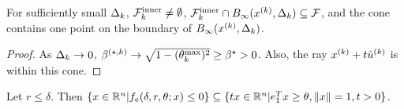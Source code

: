 \begin{theorem}
For sufficiently small $\Delta_k$, ${\mathcal {F}^{\text{inner}}_k} \ne \emptyset$, ${\mathcal {F}^{\text{inner}}_k} \cap B_{\infty}({x^{(k)}}, \Delta_k) \subseteq {\mathcal F}$, and the cone contains one point on the boundary of $B_{\infty}({x^{(k)}}, \Delta_k)$.
\end{theorem}
\begin{proof}
As $\Delta_k \to 0$, ${\beta^{(\star, k)}} \to \sqrt{1 - (\theta^{\text{max}}_k) ^2} \ge {\beta^{\star}} > 0$. Also, the ray ${x^{(k)}} + t {{\hat u}^{(k)}}$ is within this cone.
\end{proof}



\begin{theorem}
\label{ellipse_in_cone}
Let $r \le \delta$.
Then $\{x \in {\mathbb R^{n}} | f_e(\delta, r, \theta; x) \le 0\} \subseteq \{tx\in{\mathbb R^{n}}| e_1^T x \ge \theta,\|x\|=1, t>0\}$.
\end{theorem}


